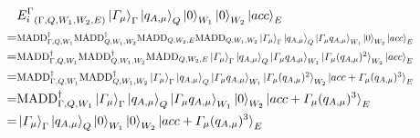 \documentclass{article}
\begin{document}
\begin{align}
    &{E_i^\Gamma}_{(\Gamma,Q,W_1,W_2,E)}\ket{\varGamma_\mu}_\Gamma\ket{q_{A,\mu}}_Q\ket{0}_{W_1}\ket{0}_{W_2}\ket{acc}_E\\
    =&\resizebox{.9\hsize}{!}{$\text{MADD}^\dagger_{\Gamma,Q,W_1}\text{MADD}^\dagger_{Q,W_1,W_2}\text{MADD}_{Q,W_2,E}\text{MADD}_{Q,W_1,W_2}\ket{\varGamma_\mu}_\Gamma\ket{q_{A,\mu}}_Q\ket{\varGamma_\mu q_{A,\mu}}_{W_1}\ket{0}_{W_2}\ket{acc}_E$}\\
    =&\resizebox{.9\hsize}{!}{$\text{MADD}^\dagger_{\Gamma,Q,W_1}\text{MADD}^\dagger_{Q,W_1,W_2}\text{MADD}_{Q,W_2,E}\ket{\varGamma_\mu}_\Gamma\ket{q_{A,\mu}}_Q\ket{\varGamma_\mu q_{A,\mu}}_{W_1}\ket{\varGamma_\mu (q_{A,\mu})^2}_{W_2}\ket{acc}_E$}\\
    =&\resizebox{.9\hsize}{!}{$\text{MADD}^\dagger_{\Gamma,Q,W_1}\text{MADD}^\dagger_{Q,W_1,W_2}\ket{\varGamma_\mu}_\Gamma\ket{q_{A,\mu}}_Q\ket{\varGamma_\mu q_{A,\mu}}_{W_1}\ket{\varGamma_\mu (q_{A,\mu})^2}_{W_2}\ket{acc+\varGamma_\mu (q_{A,\mu})^3}_E\label{comp}$}\\
    =&\text{MADD}^\dagger_{\Gamma,Q,W_1}\ket{\varGamma_\mu}_\Gamma\ket{q_{A,\mu}}_Q\ket{\varGamma_\mu q_{A,\mu}}_{W_1}\ket{0}_{W_2}\ket{acc+\varGamma_\mu (q_{A,\mu})^3}_E\\
    =&\ket{\varGamma_\mu}_\Gamma\ket{q_{A,\mu}}_Q\ket{0}_{W_1}\ket{0}_{W_2}\ket{acc+\varGamma_\mu (q_{A,\mu})^3}_E\\
\end{align}
\end{document}
